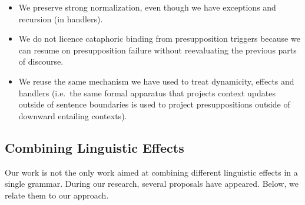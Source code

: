 \begin{itemize}
  \begin{itemize}
  \item We preserve strong normalization, even though we have exceptions
    and recursion (in handlers).
  \item We do not licence cataphoric binding from presupposition triggers
    because we can resume on presupposition failure without reevaluating
    the previous parts of discourse.
  \item We reuse the same mechanism we have used to treat dynamicity,
    effects and handlers (i.e.\ the same formal apparatus that projects
    context updates outside of sentence boundaries is used to project
    presuppositions outside of downward entailing contexts).
  \end{itemize}
\end{itemize}


\subsection{Combining Linguistic Effects}
\label{ssec:combining-linguistic-effects}

Our work is not the only work aimed at combining different linguistic
effects in a single grammar. During our research, several proposals have
appeared. Below, we relate them to our approach.

